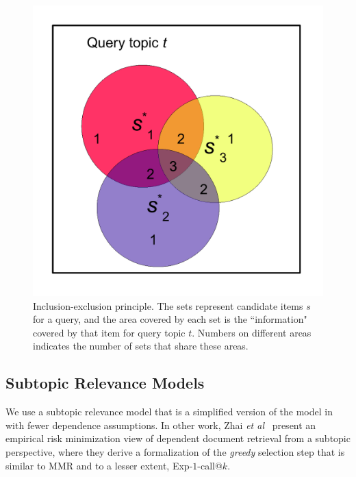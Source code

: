 \begin{figure}[t!]
\begin{center}
\centerline{\includegraphics[scale = 0.4]{inclusionExclusionPrinciple}}
\caption[Inclusion-exclusion principle.]{Inclusion-exclusion principle. The sets represent candidate
items $s$ for a query, and the area covered by each set is the
``information" covered by that item for query topic $t$. Numbers on different areas
indicates the number of sets that share these areas. }
\label{fig:inclusionExclusionPrinciple}
\end{center}
\end{figure}

\subsection{Subtopic Relevance Models} 

We use a subtopic relevance model that is a simplified version of the
model in~\cite{plmmr} with fewer dependence assumptions.  In other
work, Zhai {\it et al}~\cite{zhai03Beyond} present an empirical risk
minimization view of dependent document retrieval from a subtopic
perspective, where they derive a formalization of the
\emph{greedy} selection step that is similar to MMR and to a lesser
extent, Exp-$1$-call@$k$.

